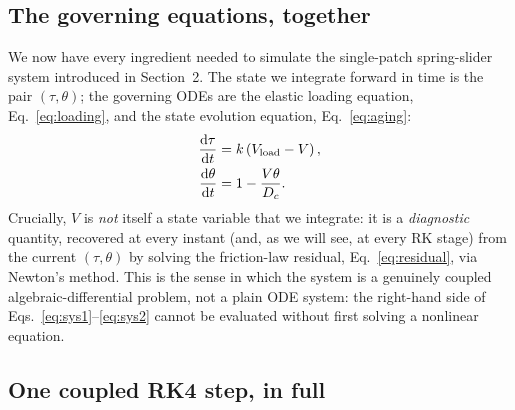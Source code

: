 \subsection{The governing equations, together}

We now have every ingredient needed to simulate the single-patch spring-slider system introduced in Section~2. The state we integrate forward in time is the pair $(\tau, \theta)$; the governing ODEs are the elastic loading equation, Eq.~\eqref{eq:loading}, and the state evolution equation, Eq.~\eqref{eq:aging}:
\begin{align}
\frac{\mathrm{d} \tau}{\mathrm{d} t} &= k\left(V_{\mathrm{load}} - V\right), \label{eq:sys1}\\
\frac{\mathrm{d} \theta}{\mathrm{d} t} &= 1 - \frac{V\theta}{D_c}. \label{eq:sys2}
\end{align}
Crucially, $V$ is \emph{not} itself a state variable that we integrate: it is a \emph{diagnostic} quantity, recovered at every instant (and, as we will see, at every RK stage) from the current $(\tau, \theta)$ by solving the friction-law residual, Eq.~\eqref{eq:residual}, via Newton's method. This is the sense in which the system is a genuinely coupled algebraic-differential problem, not a plain ODE system: the right-hand side of Eqs.~\eqref{eq:sys1}--\eqref{eq:sys2} cannot be evaluated without first solving a nonlinear equation.

\subsection{One coupled RK4 step, in full}

